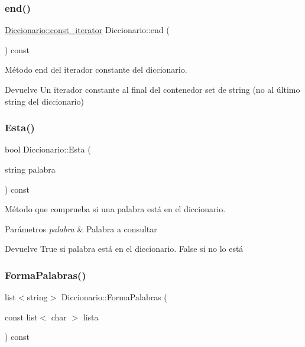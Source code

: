 \subsubsection{\texorpdfstring{end()}{end()}\hspace{0.1cm}{\footnotesize\ttfamily [2/2]}}
{\footnotesize\ttfamily \hyperlink{classDiccionario_acc32ba2eaee59fdd4836d9a28f04afd0}{Diccionario\+::const\+\_\+iterator} Diccionario\+::end (\begin{DoxyParamCaption}{ }\end{DoxyParamCaption}) const}



Método end del iterador constante del diccionario. 

\begin{DoxyReturn}{Devuelve}
Un iterador constante al final del contenedor set de string (no al último string del diccionario) 
\end{DoxyReturn}
\mbox{\label{classDiccionario_a2859234e7c6a7c2cc9120b32d814e7a1}} 
\subsubsection{\texorpdfstring{Esta()}{Esta()}}
{\footnotesize\ttfamily bool Diccionario\+::\+Esta (\begin{DoxyParamCaption}\item[{string}]{palabra }\end{DoxyParamCaption}) const}



Método que comprueba si una palabra está en el diccionario. 


\begin{DoxyParams}{Parámetros}
{\em palabra} & Palabra a consultar \\
\hline
\end{DoxyParams}
\begin{DoxyReturn}{Devuelve}
True si palabra está en el diccionario. False si no lo está 
\end{DoxyReturn}
\mbox{\label{classDiccionario_ac46deb245f9647bd4c2b9e53bf09d355}} 
\subsubsection{\texorpdfstring{Forma\+Palabras()}{FormaPalabras()}}
{\footnotesize\ttfamily list$<$string$>$ Diccionario\+::\+Forma\+Palabras (\begin{DoxyParamCaption}\item[{const list$<$ char $>$}]{lista }\end{DoxyParamCaption}) const}



